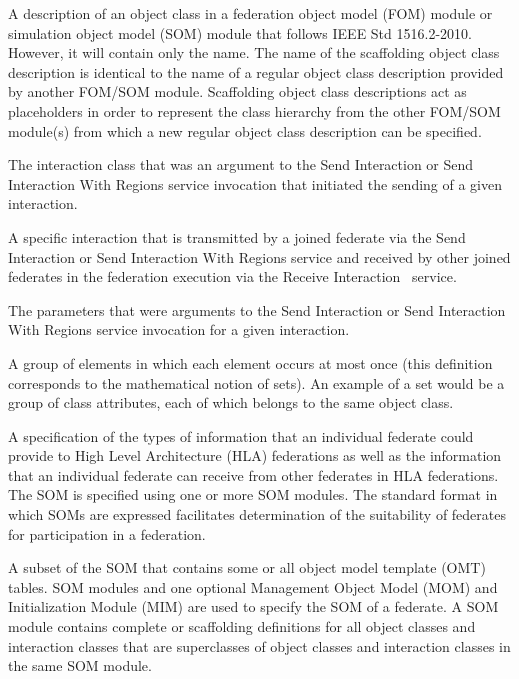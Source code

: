  A description of an object class in a federation object model (FOM) module or simulation object model (SOM) module that follows IEEE Std 1516.2-2010. However, it will contain only the name. The name of the scaffolding object class description is identical to the name of a regular object class description provided by another FOM/SOM module. Scaffolding object class descriptions act as placeholders in order to represent the class hierarchy from the other FOM/SOM module(s) from which a new regular object class description can be specified.

 The interaction class that was an argument to the Send Interaction or Send Interaction With Regions service invocation that initiated the sending of a given interaction.

 A specific interaction that is transmitted by a joined federate via the Send Interaction or Send Interaction With Regions service and received by other joined federates in the federation execution via the Receive Interaction \rtiinitiated\ service.

\clearpage
{} The parameters that were arguments to the Send Interaction or Send Interaction With Regions service invocation for a given interaction.

 A group of elements in which each element occurs at most once (this definition corresponds to the mathematical notion of sets). An example of a set would be a group of class attributes, each of which belongs to the same object class.

 A specification of the types of information that an individual federate could provide to High Level Architecture (HLA) federations as well as the information that an individual federate can receive from other federates in HLA federations. The SOM is specified using one or more SOM modules. The standard format in which SOMs are expressed facilitates determination of the suitability of federates for participation in a federation.

 A subset of the SOM that contains some or all object model template (OMT) tables. SOM modules and one optional Management Object Model (MOM) and Initialization Module (MIM) are used to specify the SOM of a federate. A SOM module contains complete or scaffolding definitions for all object classes and interaction classes that are superclasses of object classes and interaction classes in the same SOM module.


